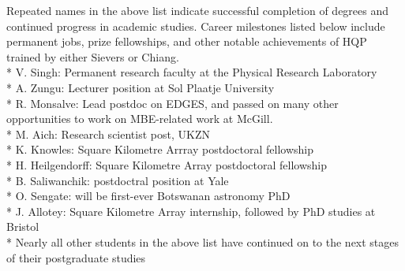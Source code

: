 \documentclass[letterpaper,11pt,preprint]{aastex}
\newcommand{\mbe}{{\rm MBE}}
\begin{document}
Repeated names in the above list indicate successful completion of
degrees and continued progress in academic studies.  Career milestones
listed below include permanent jobs, prize fellowships, and other
notable achievements of HQP trained by either Sievers or Chiang.  \\
* V. Singh: Permanent research faculty at the Physical Research
Laboratory\\
* A. Zungu: Lecturer position at Sol Plaatje University\\
* R. Monsalve: Lead postdoc on EDGES, and passed on many other
opportunities to work on \mbe-related work at McGill.\\
* M. Aich: Research scientist post, UKZN\\
* K. Knowles: Square Kilometre Arrray postdoctoral fellowship\\
* H. Heilgendorff: Square Kilometre Array postdoctoral fellowship\\
* B. Saliwanchik: postdoctral position at Yale\\
* O. Sengate: will be first-ever Botswanan astronomy PhD\\
* J. Allotey: Square Kilometre Array internship, followed by PhD studies at Bristol\\
* Nearly all other students in the above list have continued on to the
next stages of their postgraduate studies\\


%

%

\end{document}
